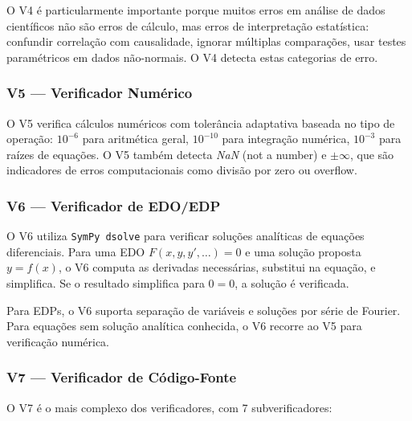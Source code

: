 O V4 é particularmente importante porque muitos erros em análise de dados
científicos não são erros de cálculo, mas erros de interpretação estatística:
confundir correlação com causalidade, ignorar múltiplas comparações, usar
testes paramétricos em dados não-normais. O V4 detecta estas categorias de
erro.

\subsubsection{V5 — Verificador Numérico}

O V5 verifica cálculos numéricos com tolerância adaptativa baseada no tipo
de operação: $10^{-6}$ para aritmética geral, $10^{-10}$ para integração
numérica, $10^{-3}$ para raízes de equações. O V5 também detecta \textit{NaN}
(not a number) e $\pm\infty$, que são indicadores de erros computacionais
como divisão por zero ou overflow.

\subsubsection{V6 — Verificador de EDO/EDP}

O V6 utiliza \texttt{SymPy dsolve} para verificar soluções analíticas de
equações diferenciais. Para uma EDO $F(x, y, y', \ldots) = 0$ e uma solução
proposta $y = f(x)$, o V6 computa as derivadas necessárias, substitui na
equação, e simplifica. Se o resultado simplifica para $0 = 0$, a solução é
verificada.

Para EDPs, o V6 suporta separação de variáveis e soluções por série de
Fourier. Para equações sem solução analítica conhecida, o V6 recorre ao
V5 para verificação numérica.

\subsubsection{V7 — Verificador de Código-Fonte}

O V7 é o mais complexo dos verificadores, com 7 subverificadores:

